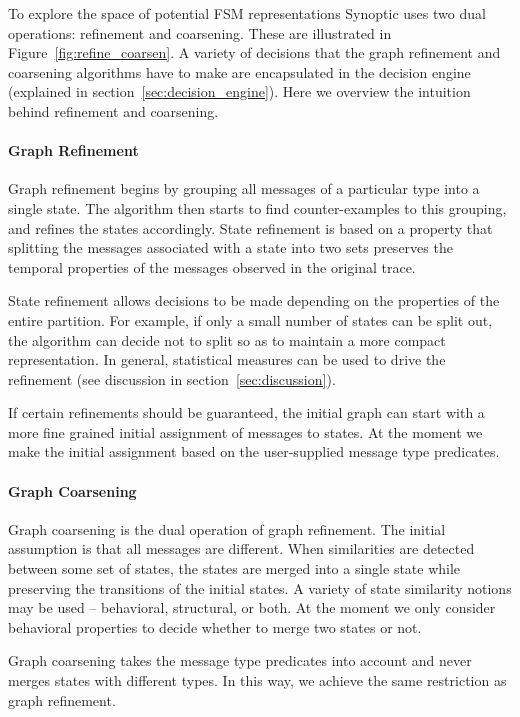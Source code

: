 To explore the space of potential FSM representations Synoptic uses
two dual operations: refinement and coarsening. These are illustrated
in Figure~\ref{fig:refine_coarsen}. A variety of decisions that the
graph refinement and coarsening algorithms have to make are
encapsulated in the decision engine (explained in
section~\ref{sec:decision_engine}). Here we overview the intuition behind
refinement and coarsening.

\paragraph{Graph Refinement}

Graph refinement begins by grouping all messages of a particular type
into a single state. The algorithm then starts to find
counter-examples to this grouping, and refines the states
accordingly. State refinement is based on a property that splitting
the messages associated with a state into two sets preserves the
temporal properties of the messages observed in the original trace.


State refinement allows decisions to be made depending on the
properties of the entire partition. For example, if only a small
number of states can be split out, the algorithm can decide not to
split so as to maintain a more compact representation. In general,
statistical measures can be used to drive the refinement (see
discussion in section~\ref{sec:discussion}).

If certain refinements should be guaranteed, the initial graph can
start with a more fine grained initial assignment of messages to
states. At the moment we make the initial assignment based on the
user-supplied message type predicates.

\paragraph{Graph Coarsening}

Graph coarsening is the dual operation of graph refinement. The
initial assumption is that all messages are different. When
similarities are detected between some set of states, the states are
merged into a single state while preserving the transitions of the
initial states. A variety of state similarity notions may be used --
behavioral, structural, or both. At the moment we only consider
behavioral properties to decide whether to merge two states or not.

Graph coarsening takes the message type predicates into account and
never merges states with different types. In this way, we achieve the
same restriction as graph refinement.
